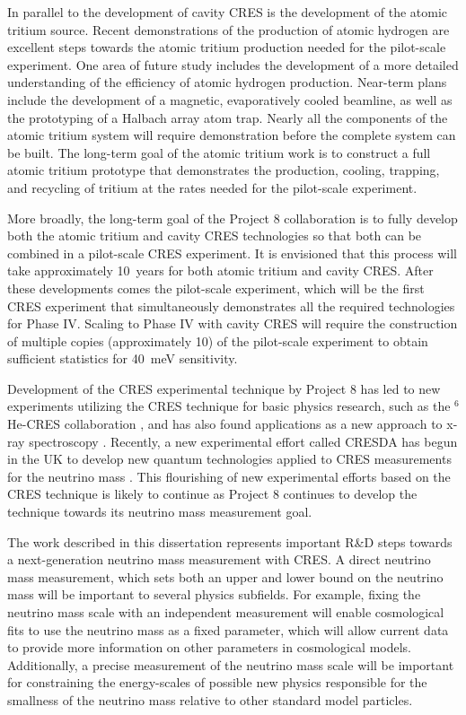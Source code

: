 In parallel to the development of cavity CRES is the development of the atomic tritium source. Recent demonstrations of the production of atomic hydrogen are excellent steps towards the atomic tritium production needed for the pilot-scale experiment. One area of future study includes the development of a more detailed understanding of the efficiency of atomic hydrogen production. Near-term plans include the development of a magnetic, evaporatively cooled beamline, as well as the prototyping of a Halbach array atom trap. Nearly all the components of the atomic tritium system will require demonstration before the complete system can be built. The long-term goal of the atomic tritium work is to construct a full atomic tritium prototype that demonstrates the production, cooling, trapping, and recycling of tritium at the rates needed for the pilot-scale experiment.

More broadly, the long-term goal of the Project 8 collaboration is to fully develop both the atomic tritium and cavity CRES technologies so that both can be combined in a pilot-scale CRES experiment. It is envisioned that this process will take approximately 10~years for both atomic tritium and cavity CRES. After these developments comes the pilot-scale experiment, which will be the first CRES experiment that simultaneously demonstrates all the required technologies for Phase IV. Scaling to Phase IV with cavity CRES will require the construction of multiple copies (approximately 10) of the pilot-scale experiment to obtain sufficient statistics for 40~meV sensitivity.

Development of the CRES experimental technique by Project 8 has led to new experiments utilizing the CRES technique for basic physics research, such as the $^6$He-CRES collaboration \cite{cresHe6}, and has also found applications as a new approach to x-ray spectroscopy \cite{cresXrayKazkaz}. Recently, a new experimental effort called CRESDA has begun in the UK to develop new quantum technologies applied to CRES measurements for the neutrino mass \cite{cresda}. This flourishing of new experimental efforts based on the CRES technique is likely to continue as Project 8 continues to develop the technique towards its neutrino mass measurement goal.

The work described in this dissertation represents important R\&D steps towards a next-generation neutrino mass measurement with CRES. A direct neutrino mass measurement, which sets both an upper and lower bound on the neutrino mass will be important to several physics subfields. For example, fixing the neutrino mass scale with an independent measurement will enable cosmological fits to use the neutrino mass as a fixed parameter, which will allow current data to provide more information on other parameters in cosmological models. Additionally, a precise measurement of the neutrino mass scale will be important for constraining the energy-scales of possible new physics responsible for the smallness of the neutrino mass relative to other standard model particles. 

